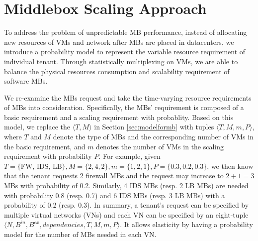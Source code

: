 \documentclass[review]{elsarticle}
\begin{document}

\section{Middlebox Scaling Approach}\label{sec:scalibility}
To address the problem of unpredictable MB performance, instead of allocating new resources of VMs and network after MBs are placed in datacenters, we introduce a probability model to represent the variable resource requirement of individual tenant. Through statistically multiplexing on VMs, we are able to balance the physical resources consumption and scalability requirement of software MBs. 

We re-examine the MBs request and take the time-varying resource requirements of MBs into consideration. Specifically, the MBs' requirement is composed of a basic requirement and a scaling requirement with probablity. Based on this model, we replace the $\langle T, M \rangle$ in Section \ref{sec:modelformb} with tuples $\langle T, M, m, P\rangle$, where $T$ and $M$  denote the type of MBs and the corresponding number of VMs in the basic requirement, and $m$ denotes the number of VMs in the scaling requirement with probability $P$. For example, given $T=\{\text{FW, IDS, LB}\}, M=\{ 2, 4, 2\}, m=\{1, 2, 1\}, P=\{0.3, 0.2, 0.3\}$, we then know that the tenant requests 2 firewall MBs and the request may increase to $2+1=3$ MBs with probability of 0.2. Similarly, 4 IDS MBs (resp. 2 LB MBs) are needed with probability 0.8 (resp. 0.7) and 6 IDS MBs (resp. 3 LB MBs) with a probability of 0.2 (resp. 0.3). In summary, a tenant's request can be specified by multiple virtual networks (VNs) and each VN can be specified by an eight-tuple $\langle N, B^{in}, B^{ex}, dependencies, T, M, m, P\rangle$. It allows elasticity by having a probability model for the number of MBs needed in each VN. 
\end{document}
